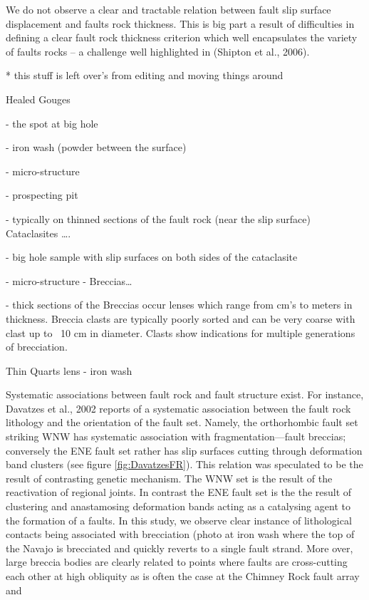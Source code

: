 \documentclass[12pt,a4paper]{article}
\begin{document}
We do not observe a clear and tractable relation between fault slip surface displacement and faults rock thickness. This is big part a result of difficulties in defining a clear fault rock thickness criterion which well encapsulates the variety of faults rocks -- a challenge well highlighted in  (Shipton et al., 2006).

* this stuff is left over's from  editing and moving things around

Healed Gouges

-	the spot at big hole

-	iron wash (powder between the surface)

-	micro-structure

-	prospecting pit

-	typically on thinned sections of the fault rock (near the slip surface)
Cataclasites ….

-	big hole sample with slip surfaces on both sides of the cataclasite

-	micro-structure
-
Breccias…

-	thick sections  of the 
Breccias occur lenses which range from cm’s to meters in thickness. Breccia clasts are typically poorly sorted and can be very coarse with clast up to ~10 cm in diameter. Clasts show indications for multiple generations of brecciation.


Thin Quarts lens
-	iron wash


Systematic associations between fault rock and fault structure exist. For instance, Davatzes et al., 2002 reports of a systematic association between the fault rock lithology and the orientation of the fault set. Namely, the orthorhombic fault set striking WNW has systematic association with fragmentation—fault breccias; conversely the ENE fault set rather has slip surfaces cutting through deformation band clusters (see figure \ref{fig:DavatzesFR}). This relation was speculated to be the result of contrasting genetic mechanism. The WNW set is the result of the reactivation of regional joints. In contrast the ENE fault set is the the result of clustering and anastamosing deformation bands acting as a catalysing agent to the formation of a faults.
In this study, we observe clear instance of lithological contacts being associated with brecciation (photo at iron wash where the top of the Navajo is brecciated and quickly reverts to a single fault strand. More over, large breccia bodies are clearly related to points where faults are cross-cutting each other at high obliquity as is often the case at the Chimney Rock fault array and 
\end{document}

